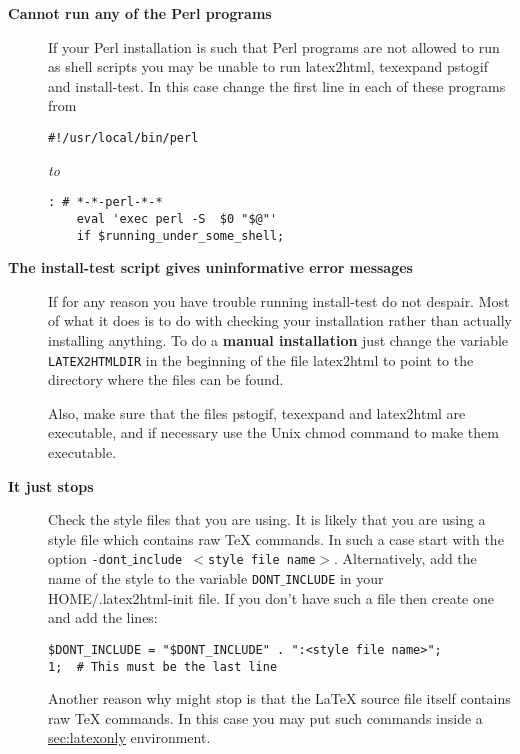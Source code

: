 \begin{description}
\item [{\bf Cannot run any of the Perl programs}]
If your Perl installation is such that Perl programs are not allowed 
to run as shell scripts you may be unable to run  {\fn latex2html}, {\fn texexpand} {\fn pstogif}
and  {\fn install-test}. In this case change the first line in each of these
programs from
\begin{verbatim}
#!/usr/local/bin/perl
\end{verbatim}

{\em to}

\begin{verbatim}
: # *-*-perl-*-*
    eval 'exec perl -S  $0 "$@"'
    if $running_under_some_shell; 
\end{verbatim}

\item [{\bf The {\fn install-test} script gives uninformative error messages}]
If for any reason you have trouble running {\fn install-test}
do not despair. Most of what it does is to do with checking
your installation rather than actually installing anything.
To do a {\bf manual installation} just change the variable
{\tt LATEX2HTMLDIR} in the beginning of the file {\fn latex2html}
to point to the directory where the \latextohtml files can be found.

Also, make sure that the files
{\fn pstogif}, {\fn texexpand} and {\fn latex2html} are executable,
and if necessary use the Unix {\fn chmod} command to make them 
executable.

\item [{\bf It just stops}] Check the style
files that you are using. It is likely that you are using
a style file which contains raw TeX commands. In such a case
start \latextohtml with the option {\tt -dont$\_$include $<$style file
name$>$}. Alternatively, add the name of the style to the variable 
{\tt DONT$\_$INCLUDE} in your
{\fn HOME/.latex2html-init} file. If you don't have such a file then
create one and add the lines:
\begin{verbatim}
$DONT_INCLUDE = "$DONT_INCLUDE" . ":<style file name>";
1; 	# This must be the last line
\end{verbatim}

Another reason why \latextohtml might stop is that the LaTeX source
file itself contains raw TeX commands. In this case you may 
put such commands inside a 
\hyperref{{\tt latexonly}}{{\tt latexonly (see Section }}{)}{sec:latexonly}
environment.


\end{description}
